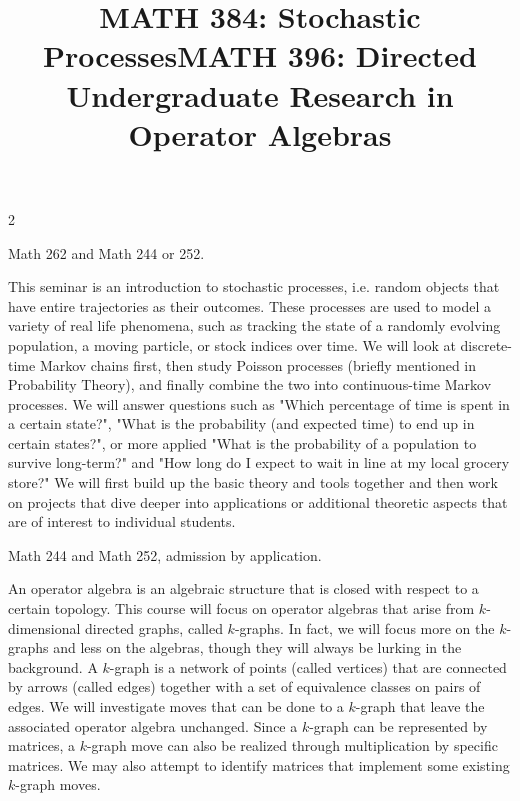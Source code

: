 \documentclass[12pt]{article}
\newcommand{\bolder}{\textbf}
\begin{document}
\begin{multicols}{2}
\begin{tcolorbox}[colback=white, colframe=black]
    \begin{center}
    \title{{\large \bolder{MATH 384: Stochastic Processes}}}
    \end{center}
\end{tcolorbox}

 Math 262 and Math 244 or 252.


This seminar is an introduction to stochastic processes, i.e. random objects that have entire trajectories as their outcomes. These processes are used to model a variety of real life phenomena, such as tracking the state of a randomly evolving population, a moving particle, or stock indices over time.  We will look at discrete-time Markov chains first, then study Poisson processes (briefly mentioned in Probability Theory), and finally combine the two into continuous-time Markov processes. We will answer questions such as "Which percentage of time is spent in a certain state?", "What is the probability (and expected time) to end up in certain states?", or more applied "What is the probability of a population to survive long-term?" and "How long do I expect to wait in line at my local grocery store?"  We will first build up the basic theory and tools together and then work on projects that dive deeper into applications or additional theoretic aspects that are of interest to individual students. 


\begin{tcolorbox}[colback=white, colframe=black]
    \begin{center}
    \title{{\large \bolder{MATH 396: Directed Undergraduate Research in Operator Algebras}}}
    \end{center}
\end{tcolorbox}

 Math 244 and Math 252, admission by application.

An operator algebra is an algebraic structure that is closed with respect to a certain topology. This course will focus on operator algebras that arise from $k$-dimensional directed graphs, called $k$-graphs. In fact, we will focus more on the $k$-graphs and less on the algebras, though they will always be lurking in the background. A $k$-graph is a network of points (called vertices) that are connected by arrows (called edges) together with a set of equivalence classes on pairs of edges. We will investigate moves that can be done to a $k$-graph that leave the associated operator algebra unchanged. Since a $k$-graph can be represented by matrices, a $k$-graph move can also be realized through multiplication by specific matrices. We may also attempt to identify matrices that implement some existing $k$-graph moves.



\end{multicols}
\end{document}
